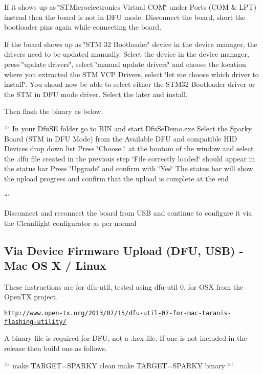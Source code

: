 If it shows up as \char`\"{}\+S\+T\+Microelectronics Virtual C\+O\+M\char`\"{} under Ports (C\+O\+M \& L\+P\+T) instead then the board is not in D\+F\+U mode. Disconnect the board, short the bootloader pins again while connecting the board.

If the board shows up as \char`\"{}\+S\+T\+M 32 Bootloader\char`\"{} device in the device manager, the drivers need to be updated manually. Select the device in the device manager, press \char`\"{}update drivers\char`\"{}, select \char`\"{}manual update drivers\char`\"{} and choose the location where you extracted the S\+T\+M V\+C\+P Drivers, select \char`\"{}let me choose which driver to install\char`\"{}. You shoud now be able to select either the S\+T\+M32 Bootloader driver or the S\+T\+M in D\+F\+U mode driver. Select the later and install.

Then flash the binary as below.

``` In your Dfu\+S\+E folder go to B\+I\+N and start Dfu\+Se\+Demo.\+exe Select the Sparky Board (S\+T\+M in D\+F\+U Mode) from the Available D\+F\+U and compatible H\+I\+D Devices drop down list Press \char`\"{}\+Choose..\char`\"{} at the bootom of the window and select the .dfu file created in the previous step \char`\"{}\+File correctly loaded\char`\"{} should appear in the status bar Press \char`\"{}\+Upgrade\char`\"{} and confirm with \char`\"{}\+Yes\char`\"{} The status bar will show the upload progress and confirm that the upload is complete at the end

```

Disconnect and reconnect the board from U\+S\+B and continue to configure it via the Cleanflight configurator as per normal

\subsection*{Via Device Firmware Upload (D\+F\+U, U\+S\+B) -\/ Mac O\+S X / Linux}

These instructions are for dfu-\/util, tested using dfu-\/util 0. for O\+S\+X from the Open\+T\+X project.

\href{http://www.open-tx.org/2013/07/15/dfu-util-07-for-mac-taranis-flashing-utility/}{\tt http\+://www.\+open-\/tx.\+org/2013/07/15/dfu-\/util-\/07-\/for-\/mac-\/taranis-\/flashing-\/utility/}

A binary file is required for D\+F\+U, not a .hex file. If one is not included in the release then build one as follows.

``` make T\+A\+R\+G\+E\+T=S\+P\+A\+R\+K\+Y clean make T\+A\+R\+G\+E\+T=S\+P\+A\+R\+K\+Y binary ```

